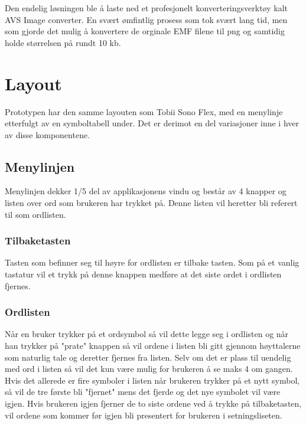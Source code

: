 { 
Den endelig løsningen ble å laste ned et profesjonelt konverteringsverktøy kalt AVS Image converter. En svært ømfintlig prosess som tok svært lang tid, men som gjorde det mulig å konvertere de orginale EMF filene til png og samtidig holde størrelsen på rundt 10 kb. 
 
 
 
 
 

 
 
\section{Layout} 
 
 
Prototypen har den samme layouten som Tobii Sono Flex, med en menylinje etterfulgt av en symboltabell under. Det er derimot en del variasjoner inne i hver av disse komponentene. 
 
 
\subsection{Menylinjen} 
 
Menylinjen dekker 1/5 del av applikasjonens vindu og består av 4 knapper og listen over ord som brukeren har trykket på. Denne listen vil heretter bli referert til som ordlisten. 
 
 
\subsubsection{Tilbaketasten} 
 
Tasten som befinner seg til høyre for ordlisten er tilbake tasten. Som på et vanlig tastatur vil et trykk på denne knappen medføre at det siste ordet i ordlisten fjernes. 
 
 
\subsubsection{Ordlisten} 
 
Når en bruker trykker på et ordsymbol så vil dette legge seg i ordlisten og når han trykker på "prate" knappen så vil ordene i listen bli gitt gjennom høyttalerne som naturlig tale og deretter fjernes fra listen. Selv om det er plass til uendelig med ord i listen så vil det kun være mulig for brukeren å se maks 4 om gangen. Hvis det allerede er fire symboler i listen når brukeren trykker på et nytt symbol, så vil de tre første bli "fjernet" mens det fjerde og det nye symbolet vil være igjen. Hvis brukeren igjen fjerner de to siste ordene ved å trykke på tilbaketasten,  vil ordene som kommer før igjen bli presentert for brukeren i setningsliseten.  
 
}
